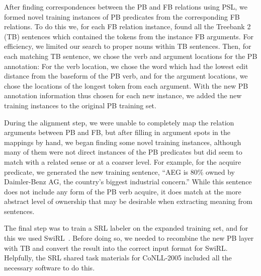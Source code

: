 After finding correspondences between the PB and FB relations using PSL, we formed novel training instances of PB predicates from the corresponding FB relations.
To do this we, for each FB relation instance, found all the Treebank 2 (TB) sentences which contained the tokens from the instance FB arguments.
For efficiency, we limited our search to proper nouns within TB sentences.
Then, for each matching TB sentence, we chose the verb and argument locations for the PB annotation:  For the verb location, we chose the word which had the lowest edit distance from the baseform of the PB verb, and for the argument locations, we chose the locations of the longest token from each argument.
With the new PB annotation information thus chosen for each new instance, we added the new training instances to the original PB training set.

During the alignment step, we were unable to completely map the relation arguments between PB and FB, but after filling in argument spots in the mappings by hand, we began finding some novel training instances, although many of them were not direct instances of the PB predicates but did seem to match with a related sense or at a coarser level.
For example, for the acquire predicate, we generated the new training sentence, “AEG is 80\% owned by Daimler-Benz AG, the country's biggest industrial concern.”
While this sentence does not include any form of the PB verb acquire, it does match at the more abstract level of ownership that may be desirable when extracting meaning from sentences.

The final step was to train a SRL labeler on the expanded training set, and for this we used SwiRL~\cite{surdeanu_combination_2007}.
Before doing so, we needed to recombine the new PB layer with TB and convert the result into the correct input format for SwiRL.  Helpfully, the SRL shared task materials for CoNLL-2005 included all the necessary software to do this.

